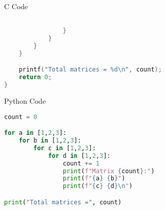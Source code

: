 \documentclass{beamer}
\begin{document}
\begin{frame}[fragile]{C Code}
\begin{lstlisting}[language=C]

                }
            }
        }
    }

    printf("Total matrices = %d\n", count);
    return 0;
}
\end{lstlisting}
\end{frame}


\begin{frame}[fragile]{Python Code}
\begin{lstlisting}[language=Python]
count = 0

for a in [1,2,3]:
    for b in [1,2,3]:
        for c in [1,2,3]:
            for d in [1,2,3]:
                count += 1
                print(f"Matrix {count}:")
                print(f"{a} {b}")
                print(f"{c} {d}\n")

print("Total matrices =", count)
\end{lstlisting}
\end{frame}
\end{document}
